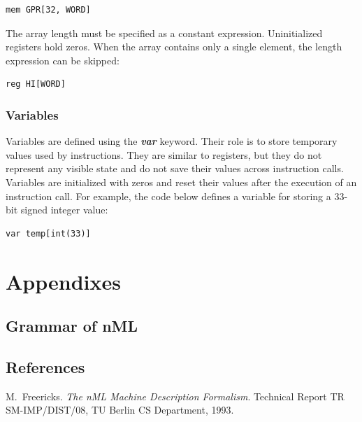\documentclass[oneside,final,14pt]{extreport}
\begin{document}
\begin{lstlisting}
mem GPR[32, WORD]
\end{lstlisting}

The array length must be specified as a constant expression. Uninitialized registers hold
zeros. When the array contains only a single element, the length expression can be skipped:

\begin{lstlisting}
reg HI[WORD]
\end{lstlisting}

\subsection{Variables}

Variables are defined using the \textbf{\textit{var}} keyword. Their role is to store
temporary values used by instructions. They are similar to registers, but they do not represent
any visible state and do not save their values across instruction calls. Variables are initialized
with zeros and reset their values after the execution of an instruction call. For example, the code
below defines a variable for storing a 33-bit signed integer value:

\begin{lstlisting}
var temp[int(33)]
\end{lstlisting}

% 


\chapter{Appendixes}

\section{Grammar of nML}

\section{References}



\begin{thebibliography}{1}

M.~Freericks.
\emph{The nML Machine Description Formalism}.
Technical Report TR SM-IMP/DIST/08, TU Berlin CS Department, 1993.

\end{thebibliography}
\end{document}
